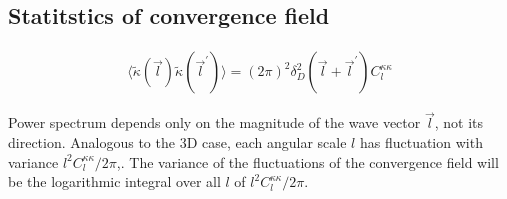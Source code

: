 \documentclass[12pt]{article}
\newcommand{\beq}{\begin{equation}}
\newcommand{\eeq}{\end{equation}}
\newcommand{\beqa}{\begin{eqnarray}}
\newcommand{\eeqa}{\end{eqnarray}}
\newcommand{\beqal}{\begin{aligned}}
\newcommand{\eeqal}{\end{aligned}}
\numberwithin{equation}{section}
\begin{document}
%
%
%
%
%
%
%
%
%
%


\subsection{Statitstics of convergence field}
\beqa
\langle \tilde{\kappa}(\vec{l}) \tilde{\kappa}(\vec{l}^\prime)\rangle = (2\pi)^2 \delta_D^2 (\vec{l} + \vec{l}^\prime) C_l^{\kappa \kappa}
\eeqa

Power spectrum depends only on the magnitude of the wave vector $\vec{l}$, not its direction. Analogous to the 3D case, each angular scale $l$ has fluctuation with variance $l^2 C_l^{\kappa \kappa} / 2 \pi$,. The variance of the fluctuations of the convergence field will be the logarithmic integral over all $l$ of $l^2 C_l^{\kappa \kappa}/2\pi$.
\end{document}
